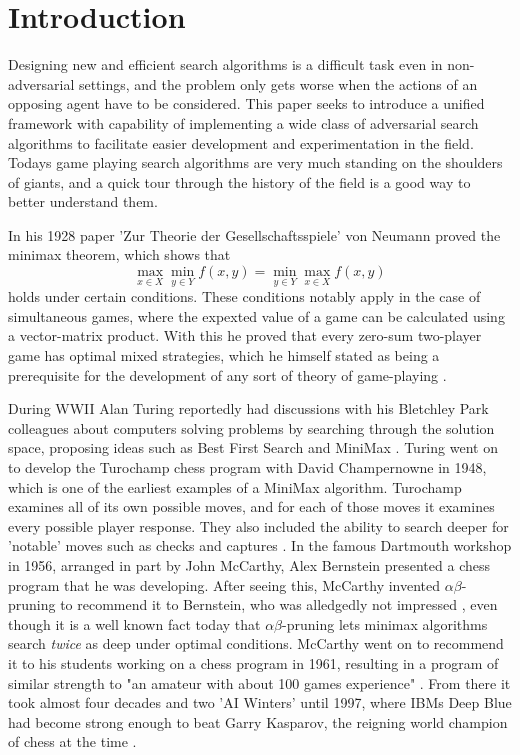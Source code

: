 \section{Introduction}

Designing new and efficient search algorithms is a difficult task even in non-adversarial settings, and the problem only gets worse when the actions of an opposing agent have to be considered. This paper seeks to introduce a unified framework with capability of implementing a wide class of adversarial search algorithms to facilitate easier development and experimentation in the field. Todays game playing search algorithms are very much standing on the shoulders of giants, and a quick tour through the history of the field is a good way to better understand them.

In his 1928 paper 'Zur Theorie der Gesellschaftsspiele' von Neumann proved the minimax theorem, which shows that
\begin{equation*}
    \max_{x\in X}\min_{y\in Y} f(x, y) = \min_{y\in Y}\max_{x\in X} f(x, y)   
\end{equation*}
holds under certain conditions. These conditions notably apply in the case of simultaneous games, where the expexted value of a game can be calculated using a vector-matrix product. With this he proved that every zero-sum two-player game has optimal mixed strategies, which he himself stated as being a prerequisite for the development of any sort of theory of game-playing \cite{Kjeldsen2001}. 

During WWII Alan Turing reportedly had discussions with his Bletchley Park colleagues about computers solving problems by searching through the solution space, proposing ideas such as Best First Search and MiniMax \cite{Copeland2006}. Turing went on to develop the Turochamp chess program with David Champernowne in 1948, which is one of the earliest examples of a MiniMax algorithm. Turochamp examines all of its own possible moves, and for each of those moves it examines every possible player response. They also included the ability to search deeper for 'notable' moves such as checks and captures \cite{Slomson2013}. In the famous Dartmouth workshop in 1956, arranged in part by John McCarthy, Alex Bernstein presented a chess program that he was developing. After seeing this, McCarthy invented $\alpha\beta$-pruning to recommend it to Bernstein, who was alledgedly not impressed \cite{McCarthy2006}, even though it is a well known fact today that $\alpha\beta$-pruning lets minimax algorithms search \textit{twice} as deep under optimal conditions. McCarthy went on to recommend it to his students working on a  chess program in 1961, resulting in a program of similar strength to "an amateur with about 100 games experience" \cite{Kotok2004}. From there it took almost four decades and two 'AI Winters' until 1997, where IBMs Deep Blue had become strong enough to beat Garry Kasparov, the reigning world champion of chess at the time \cite{Campbell2002}.

